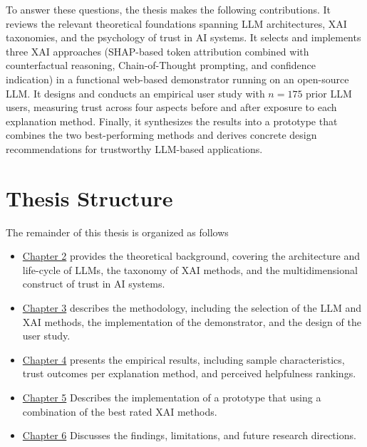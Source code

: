 To answer these questions, the thesis makes the following contributions.
It reviews the relevant theoretical foundations spanning LLM architectures, XAI taxonomies, and the psychology of trust in AI systems.
It selects and implements three XAI approaches (SHAP-based token attribution combined
with counterfactual reasoning, Chain-of-Thought prompting, and confidence
indication) in a functional web-based demonstrator running on an open-source LLM.
It designs and conducts an empirical user study with $n = 175$ prior LLM users,
measuring trust across four aspects before and after exposure to each explanation
method.
Finally, it synthesizes the results into a prototype that combines the two
best-performing methods and derives concrete design recommendations for
trustworthy LLM-based applications.
 
\section{Thesis Structure}
 
The remainder of this thesis is organized as follows

\begin{itemize}
    \item \hyperref[ch:theory]{Chapter 2} provides the theoretical background, covering the architecture and life-cycle of LLMs, the taxonomy of XAI methods, and the multidimensional construct of trust in AI systems.
    \item \hyperref[ch:methods]{Chapter 3} describes the methodology, including the selection of the LLM and XAI methods, the implementation of the demonstrator, and the design of the user study.
    \item \hyperref[ch:results]{Chapter 4} presents the empirical results, including sample characteristics, trust outcomes per explanation method, and perceived helpfulness rankings.
    \item \hyperref[ch:prototype]{Chapter 5} Describes the implementation of a prototype that using a combination of the best rated XAI methods.
    \item \hyperref[ch:discussion]{Chapter 6} Discusses the findings, limitations, and future research directions.
\end{itemize}